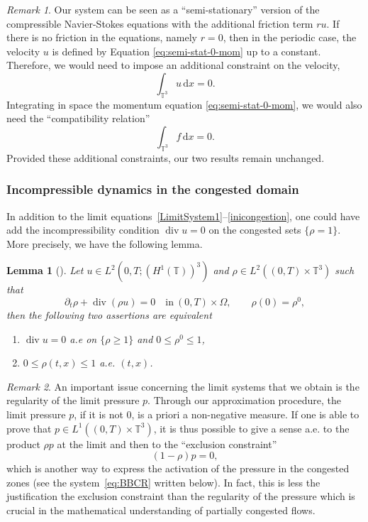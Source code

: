 \documentclass[10pt]{amsart}
\newenvironment{enumeratei}
{\bgroup\def\theenumi{\roman{enumi}}\def\theenumii{\arabic{enumii}}\begin{enumerate}}
{\end{enumerate}\egroup}
\newcommand{\<}{\bigl\langle}
\renewcommand{\>}{\bigr\rangle}
\newtheorem{lem}[thm]{Lemma}
\theoremstyle{definition}
\theoremstyle{remark}
\newtheorem{remark}{Remark}
\newcommand{\TT}{\mathbb{T}^3}
\DeclareMathOperator{\Div}{div}
\newcommand{\di}{\,\mathrm{d}}
\begin{document}
\begin{remark}
Our system can be seen as a ``semi-stationary'' version of the compressible Navier-Stokes equations with the additional friction term $ru$. If there is no friction in the equations, namely $r=0$, then in the periodic case, the velocity $u$ is defined by Equation \eqref{eq:semi-stat-0-mom} up to a constant.
Therefore, we would need to impose an additional constraint on the velocity, \eg
\[
\int_{\TT}{u \di x} = 0.
\]
Integrating in space the momentum equation \eqref{eq:semi-stat-0-mom}, we would also need the ``compatibility relation''
\[
\int_{\TT}{f \di x} = 0.
\]
Provided these additional constraints, our two results remain unchanged.
\end{remark}

\subsubsection*{Incompressible dynamics in the congested domain}
In addition to the limit equations~\eqref{LimitSystem1}--\eqref{inicongestion}, one could have add the incompressibility condition $\Div u = 0$ on the congested sets $\{\rho = 1\}$.
More precisely, we have the following lemma.
\begin{lem}[{\cite[Lem.\,2.1]{lions1999}}]
Let $u \in L^2(0,T;(H^1(\mathbb{T}))^3)$ and $\rho\in L^2((0,T)\times\mathbb{T}^3)$ such that
\[
\partial_t \rho+\Div(\rho u)=0 \quad \text{in} \ (0,T)\times\Omega,\qquad \rho(0)=\rho^0,
\]
then the following two assertions are equivalent
\begin{enumeratei}
\item
$\Div u = 0$ a.e on $\{\rho \geq 1\}$ and $0 \leq \rho^0 \leq 1$,
\item
$0 \leq \rho(t,x) \leq 1$ a.e. $(t,x)$.
\end{enumeratei}
\end{lem}

\begin{remark}
An important issue concerning the limit systems that we obtain is the regularity of the limit pressure $p$.
Through our approximation procedure, the limit pressure $p$, if it is not $0$, is a priori a non-negative measure.
If one is able to prove that $p \in L^1((0,T)\times \TT)$, it is thus possible to give a sense a.e. to the product $\rho p$ at the limit and then to the ``exclusion constraint''
\[
(1-\rho) p = 0,
\]
which is another way to express the activation of the pressure in the congested zones (see the system~\eqref{eq:BBCR} written below).
In fact, this is less the justification the exclusion constraint than the regularity of the pressure which is crucial in the mathematical understanding of partially congested flows.
\end{remark}
\end{document}

